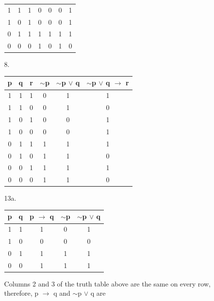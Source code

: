 \documentclass[12pt]{article}
\begin{document}
\begin{enumerate}[label = \alph*)]
\begin{itemize}
\begin{tabular}{cc|c|c|c|c|c}
                    1 & 1 & 1 & 0 & 0 & 0 & 1 \\
                    1 & 0 & 1 & 0 & 0 & 0 & 1 \\
                    0 & 1 & 1 & 1 & 1 & 1 & 1 \\
                    0 & 0 & 0 & 1 & 0 & 1 & 0 \\
                \end{tabular}
            \item [8.]
                \vspace{2em}
                \begin{tabular}{ccc|c|c|c}
                    p & q & r & $\sim$p & $\sim$p $\vee$ q & 
                            $\sim$p $\vee$ q $\rightarrow$ r \\
                    \hline
                    1 & 1 & 1 & 0 & 1 & 1 \\
                    1 & 1 & 0 & 0 & 1 & 0 \\
                    1 & 0 & 1 & 0 & 0 & 1 \\
                    1 & 0 & 0 & 0 & 0 & 1 \\
                    0 & 1 & 1 & 1 & 1 & 1 \\
                    0 & 1 & 0 & 1 & 1 & 0 \\
                    0 & 0 & 1 & 1 & 1 & 1 \\
                    0 & 0 & 0 & 1 & 1 & 0 \\
                \end{tabular}
            \item [13a.]
                \vspace{2em}
                \begin{tabular}{cc|c|c|c}
                    p & q & p $\rightarrow$ q & $\sim$p & $\sim$p $\vee$ q \\
                    \hline
                    1 & 1 & 1 & 0 & 1 \\
                    1 & 0 & 0 & 0 & 0 \\
                    0 & 1 & 1 & 1 & 1 \\
                    0 & 0 & 1 & 1 & 1 \\
                \end{tabular}
            \item []
                \vspace{1em}
                Columns 2 and 3 of the truth table above are the same on every
                row, therefore, p $\rightarrow$ q and  $\sim$p $\vee$ q are

\end{itemize}
\end{enumerate}
\end{document}
